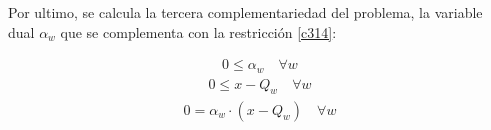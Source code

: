 \vspace{2.5mm}
Por ultimo, se calcula la tercera complementariedad del problema, la variable dual $\alpha_w$ que se complementa con la restricción \ref{c314}:

\begin{equation}
\begin{array}{rrclcl}
   0\leq \alpha_w \quad \forall w
   \label{c326}
\end{array}
\end{equation}
\begin{equation}
\begin{array}{cl}
     0 \leq x - Q_w \quad \forall w \label{c327}
\end{array}
\end{equation}
\begin{equation}
\begin{array}{cl}
     0 = \alpha_w\cdot(x - Q_w) \quad \forall w \label{c328}
\end{array}
\end{equation}